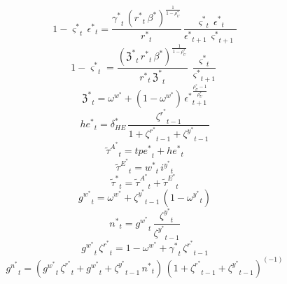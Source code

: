 \begin{dmath}
1-{{\varsigma^*}}_{t}\, {{\epsilon^*}}_{t}=\frac{{{\gamma^*}}_{t}\, \left({{r^*}}_{t}\, {{\beta^*}}\right)^{\frac{1}{1-{{\rho_U^*}}}}}{{{r^*}}_{t}}\, \frac{{{\varsigma^*}}_{t}\, {{\epsilon^*}}_{t}}{{{\epsilon^*}}_{t+1}\, {{\varsigma^*}}_{t+1}}
\end{dmath}
\begin{dmath}
1-{{\varsigma^*}}_{t}=\frac{\left({{\mathfrak{Z}^*}}_{t}\, {{r^*}}_{t}\, {{\beta^*}}\right)^{\frac{1}{1-{{\rho_U^*}}}}}{{{r^*}}_{t}\, {{\mathfrak{Z}^*}}_{t}}\, \frac{{{\varsigma^*}}_{t}}{{{\varsigma^*}}_{t+1}}
\end{dmath}
\begin{dmath}
{{\mathfrak{Z}^*}}_{t}={{\omega^w^*}}+\left(1-{{\omega^w^*}}\right)\, {{\epsilon^*}}_{t+1}^{\frac{{{\rho_U^*}}-1}{{{\rho_U^*}}}}
\end{dmath}
\begin{dmath}
{{he^*}}_{t}={{\delta_{HE}^*}}\, \frac{{{\zeta^r^*}}_{t-1}}{1+{{\zeta^r^*}}_{t-1}+{{\zeta^y^*}}_{t-1}}
\end{dmath}
\begin{dmath}
{\tilde{\tau}^A^*}_{t}={{tpe^*}}_{t}+{{he^*}}_{t}
\end{dmath}
\begin{dmath}
{\tilde{\tau}^E^*}_{t}={{w^*}}_{t}\, {{i^y^*}}_{t}
\end{dmath}
\begin{dmath}
{\tilde{\tau}^*}_{t}={\tilde{\tau}^A^*}_{t}+{\tilde{\tau}^E^*}_{t}
\end{dmath}
\begin{dmath}
{{g^w^*}}_{t}={{\omega^w^*}}+{{\zeta^y^*}}_{t-1}\, \left(1-{{\omega^y^*}}_{t}\right)
\end{dmath}
\begin{dmath}
{{n^*}}_{t}={{g^w^*}}_{t}\, \frac{{{\zeta^y^*}}_{t}}{{{\zeta^y^*}}_{t-1}}
\end{dmath}
\begin{dmath}
{{g^w^*}}_{t}\, {{\zeta^r^*}}_{t}=1-{{\omega^w^*}}+{{\gamma^*}}_{t}\, {{\zeta^r^*}}_{t-1}
\end{dmath}
\begin{dmath}
{{g^n^*}}_{t}=\left({{g^w^*}}_{t}\, {{\zeta^r^*}}_{t}+{{g^w^*}}_{t}+{{\zeta^y^*}}_{t-1}\, {{n^*}}_{t}\right)\, \left(1+{{\zeta^r^*}}_{t-1}+{{\zeta^y^*}}_{t-1}\right)^{\left(-1\right)}
\end{dmath}
